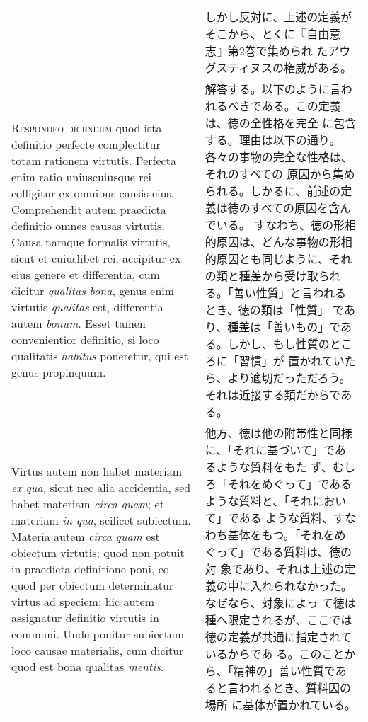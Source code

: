 \documentclass[10pt]{jsarticle}
\begin{document}
\begin{longtable}{p{21em}p{21em}}
&

しかし反対に、上述の定義がそこから、とくに『自由意志』第2巻で集められ
たアウグスティヌスの権威がある。

\\



{\scshape Respondeo dicendum} quod ista definitio perfecte
complectitur totam rationem virtutis. Perfecta enim ratio
uniuscuiusque rei colligitur ex omnibus causis eius. Comprehendit
autem praedicta definitio omnes causas virtutis. Causa namque formalis
virtutis, sicut et cuiuslibet rei, accipitur ex eius genere et
differentia, cum dicitur {\itshape qualitas bona}, genus enim virtutis
{\itshape qualitas} est, differentia autem {\itshape bonum}. Esset
tamen convenientior definitio, si loco qualitatis {\itshape habitus}
poneretur, qui est genus propinquum.


&

解答する。以下のように言われるべきである。この定義は、徳の全性格を完全
に包含する。理由は以下の通り。各々の事物の完全な性格は、それのすべての
原因から集められる。しかるに、前述の定義は徳のすべての原因を含んでいる。
すなわち、徳の形相的原因は、どんな事物の形相的原因とも同じように、それ
の類と種差から受け取られる。「善い性質」と言われるとき、徳の類は「性質」
であり、種差は「善いもの」である。しかし、もし性質のところに「習慣」が
置かれていたら、より適切だっただろう。それは近接する類だからである。

\\




Virtus autem non habet materiam {\itshape ex qua}, sicut nec alia
accidentia, sed habet materiam {\itshape circa quam}; et materiam
{\itshape in qua}, scilicet subiectum. Materia autem {\itshape circa
quam} est obiectum virtutis; quod non potuit in praedicta definitione
poni, eo quod per obiectum determinatur virtus ad speciem; hic autem
assignatur definitio virtutis in communi. Unde ponitur subiectum loco
causae materialis, cum dicitur quod est bona qualitas {\itshape
mentis}.

&

他方、徳は他の附帯性と同様に、「それに基づいて」であるような質料をもた
ず、むしろ「それをめぐって」であるような質料と、「それにおいて」である
ような質料、すなわち基体をもつ。「それをめぐって」である質料は、徳の対
象であり、それは上述の定義の中に入れられなかった。なぜなら、対象によっ
て徳は種へ限定されるが、ここでは徳の定義が共通に指定されているからであ
る。このことから、「精神の」善い性質であると言われるとき、質料因の場所
に基体が置かれている。



\end{longtable}
\end{document}

